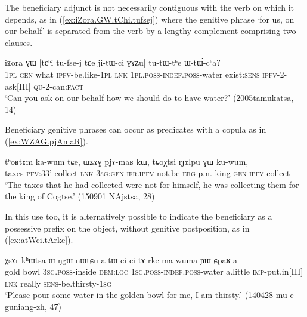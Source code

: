 The beneficiary adjunct is not necessarily contiguous with the verb on which it depends, as in (\ref{ex:iZora.GW.tChi.tufsej}) where the genitive phrase  `for us, on our behalf'  is separated from the verb  by a lengthy complement comprising two clauses.

\begin{exe}
\ex \label{ex:iZora.GW.tChi.tufsej}
\gll  iʑora ɣɯ [tɕʰi tu-fse-j tɕe ji-tɯ-ci ɣɤʑu] tu-tɯ-tʰe ɯ-tɯ́-cʰa? \\
\textsc{1pl} \textsc{gen} what \textsc{ipfv}-be.like-\textsc{1pl} \textsc{lnk} \textsc{1pl}.\textsc{poss}-\textsc{indef}.\textsc{poss}-water exist:\textsc{sens} \textsc{ipfv}-2-ask[III] \textsc{qu}-2-can:\textsc{fact} \\
\glt `Can you ask on our behalf how we should do to have water?' (2005tamukatsa, 14)
\end{exe}

Beneficiary genitive phrases can occur as predicates with a copula as  in (\ref{ex:WZAG.pjAmaR}).

 \begin{exe}
\ex \label{ex:WZAG.pjAmaR}
\gll   tʰoʁtɤm ka-wum tɕe, ɯʑɤɣ pjɤ-maʁ kɯ, tɕoχtsi rɟɤlpu ɣɯ ku-wum,  \\
taxes \textsc{pfv}:3\fl{}3'-collect \textsc{lnk} \textsc{3sg}:\textsc{gen} \textsc{ifr}.\textsc{ipfv}-not.be \textsc{erg} p.n. king \textsc{gen} \textsc{ipfv}-collect \\
\glt `The taxes that he had collected were not for himself, he was collecting them for the king of Cogtse.' (150901 NAjstsa, 28)
\end{exe}

In this use too, it is alternatively possible to indicate the beneficiary as a possessive prefix on the object, without genitive postposition, as in (\ref{ex:atWci.tArke}).

 \begin{exe}
\ex \label{ex:atWci.tArke}
\gll   χsɤr kʰɯtsa ɯ-ŋgɯ nɯtɕu a-tɯ-ci ci tɤ-rke ma wuma ɲɯ-ɕpaʁ-a \\
gold bowl \textsc{3sg}.\textsc{poss}-inside \textsc{dem}:\textsc{loc} \textsc{1sg}.\textsc{poss}-\textsc{indef}.\textsc{poss}-water a.little \textsc{imp}-put.in[III] \textsc{lnk} really \textsc{sens}-be.thirsty-\textsc{1sg} \\
\glt  `Please pour some water in the golden bowl for me, I am thirsty.' (140428 mu e guniang-zh, 47)
\end{exe}

